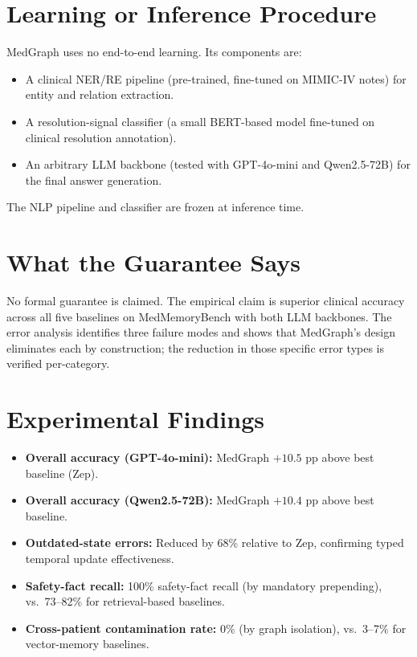 \documentclass[10pt,twocolumn]{article}
\begin{document}
\section{Learning or Inference Procedure}

MedGraph uses no end-to-end learning. Its components are:
\begin{itemize}[itemsep=2pt,parsep=0pt]
  \item A clinical NER/RE pipeline (pre-trained, fine-tuned on MIMIC-IV
    notes) for entity and relation extraction.
  \item A resolution-signal classifier (a small BERT-based model
    fine-tuned on clinical resolution annotation).
  \item An arbitrary LLM backbone (tested with GPT-4o-mini and
    Qwen2.5-72B) for the final answer generation.
\end{itemize}
The NLP pipeline and classifier are frozen at inference time.

\section{What the Guarantee Says}

No formal guarantee is claimed. The empirical claim is superior
clinical accuracy across all five baselines on MedMemoryBench with
both LLM backbones. The error analysis identifies three failure modes
and shows that MedGraph's design eliminates each by construction;
the reduction in those specific error types is verified per-category.

\section{Experimental Findings}

\begin{itemize}[itemsep=2pt,parsep=0pt]
  \item \textbf{Overall accuracy (GPT-4o-mini):} MedGraph
    $+10.5$ pp above best baseline (Zep).
  \item \textbf{Overall accuracy (Qwen2.5-72B):} MedGraph
    $+10.4$ pp above best baseline.
  \item \textbf{Outdated-state errors:} Reduced by 68\% relative
    to Zep, confirming typed temporal update effectiveness.
  \item \textbf{Safety-fact recall:} 100\% safety-fact recall
    (by mandatory prepending), vs.\ 73--82\% for retrieval-based
    baselines.
  \item \textbf{Cross-patient contamination rate:} 0\% (by graph
    isolation), vs.\ 3--7\% for vector-memory baselines.
\end{itemize}
\end{document}
